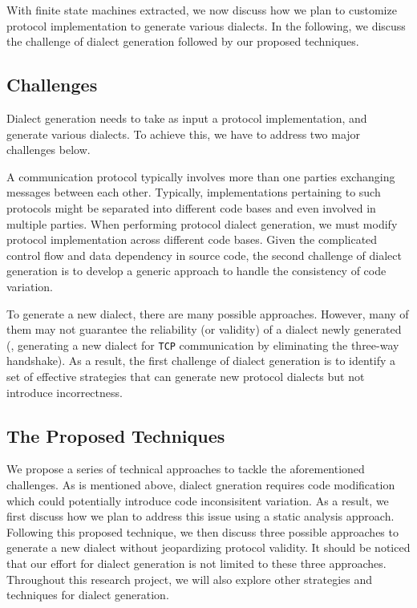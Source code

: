 With finite state machines extracted, we now discuss how we plan to customize
protocol implementation to generate various dialects. In the following, we discuss the challenge of dialect generation followed by our proposed techniques.


\subsection{Challenges}
\label{sec:task2:challenges}

Dialect generation needs to take as input a protocol implementation, and generate
various dialects. To achieve
this, we have to address two major challenges below.


 A communication protocol typically involves
more than one parties exchanging messages between each other. Typically,
implementations pertaining to such protocols might be separated into different
code bases and even involved in multiple parties. When performing protocol dialect generation, we must modify protocol implementation across different code bases. Given the complicated control flow and data dependency in source code, the second challenge of dialect generation is to develop a generic approach to handle the consistency of code variation.

To generate a new dialect, there are many possible approaches. However, many of them may not guarantee the reliability (or validity) of a dialect newly generated (\eg, generating a new dialect for \texttt{TCP} communication by eliminating the three-way handshake). As a result, the first challenge of dialect generation is to identify a set of effective strategies that can generate new protocol dialects but not introduce incorrectness. 

\subsection{The Proposed Techniques}

We propose a series of technical approaches to tackle the aforementioned challenges. As is mentioned above, dialect gneration requires code modification which could potentially introduce code inconsisitent variation. As a result, we first discuss how we plan to address this issue using a static analysis approach. Following this proposed technique, we then discuss three possible approaches to generate a new dialect without jeopardizing protocol validity. It should be noticed that our effort for dialect generation is not limited to these three approaches. Throughout this research project, we will also explore other strategies and techniques for dialect generation.

